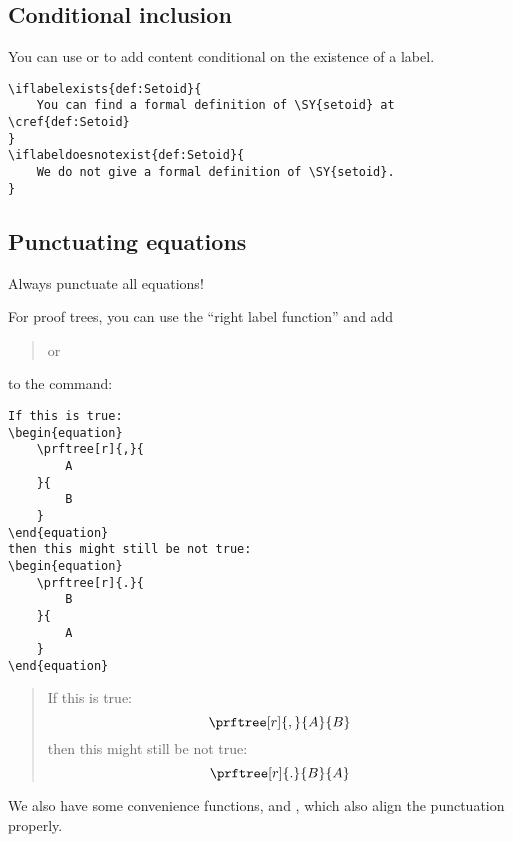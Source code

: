 \subsection{Conditional inclusion}

You can use  or   to add content conditional on the existence of a label.

\begin{verbatim}
\iflabelexists{def:Setoid}{
    You can find a formal definition of \SY{setoid} at \cref{def:Setoid}
}
\iflabeldoesnotexist{def:Setoid}{
    We do not give a formal definition of \SY{setoid}.
}
\end{verbatim}

\subsection{Punctuating equations}

Always punctuate all equations!

For proof trees, you can use the ``right label function'' and add
%
\begin{quote}
    \centering
    \str{[r]{,}} \qquad or \qquad {}
\end{quote}
%
to the  command:
%
\begin{verbatim}
If this is true:
\begin{equation}
    \prftree[r]{,}{
        A
    }{
        B
    }
\end{equation}
then this might still be not true:
\begin{equation}
    \prftree[r]{.}{
        B
    }{
        A
    }
\end{equation}
\end{verbatim}
\begin{quote}
    If this is true:
    \begin{equation}
        \prftree[r]{,}{
            A
        }{
            B
        }
    \end{equation}
    then this might still be not true:
    \begin{equation}
        \prftree[r]{.
        }{
            B
        }{
            A
        }
    \end{equation}
\end{quote}

We also have some convenience functions, \str{\\prfperiod} and \str{\\prfcomma},
which also align the punctuation properly.

